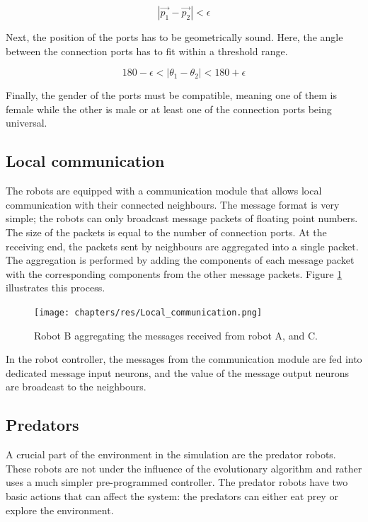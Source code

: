 \begin{equation}
|\vec{p_1} - \vec{p_2}| < \epsilon
\end{equation}

Next, the position of the ports has to be geometrically sound.
Here, the angle between the connection ports has to fit within a threshold range.

\begin{equation}
180 - \epsilon < |\theta_1 - \theta_2| < 180 + \epsilon
\end{equation}

Finally, the gender of the ports must be compatible, meaning one of them is female while the other is male or at least one of the connection ports being universal.
		
\subsection{Local communication}
\label{sec:local_comm}
The robots are equipped with a communication module that allows local communication with their connected neighbours.
The message format is very simple; the robots can only broadcast message packets of floating point numbers.
The size of the packets is equal to the number of connection ports.
At the receiving end, the packets sent by neighbours are aggregated into a single packet.
The aggregation is performed by adding the components of each message packet with the corresponding components from the other message packets. Figure \ref{fig:local_communication} illustrates this process.

\begin{figure}[H]
	\centering
	\texttt{[image: chapters/res/Local\_communication.png]}
	\caption{Robot B aggregating the messages received from robot A, and C.}
	\label{fig:local_communication}
\end{figure}

In the robot controller, the messages from the communication module are fed into dedicated message input neurons, and the value of the message output neurons are broadcast to the neighbours.

		
\subsection{Predators}
A crucial part of the environment in the simulation are the predator robots.
These robots are not under the influence of the evolutionary algorithm and rather uses a much simpler pre-programmed controller.
The predator robots have two basic actions that can affect the system: the predators can either eat prey or explore the environment.


